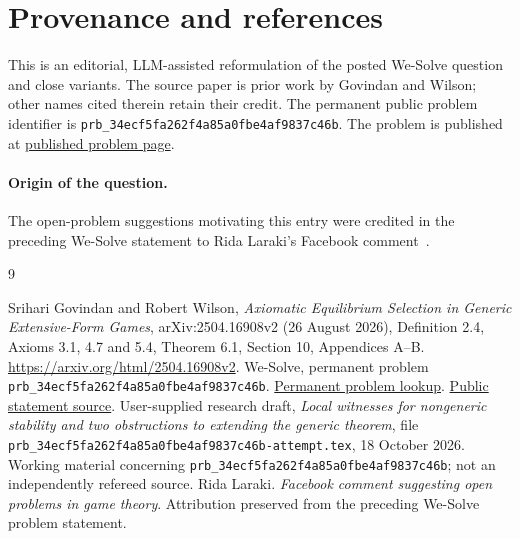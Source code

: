 \documentclass[11pt]{article}
\begin{document}
\section*{Provenance and references}
This is an editorial, LLM-assisted reformulation of the posted We-Solve
question and close variants. The source paper is prior work by
Govindan and Wilson; other names cited therein retain their credit.
The permanent public problem identifier is \texttt{prb\_34ecf5fa262f4a85a0fbe4af9837c46b}.
The problem is published at
\href{https://we-solve.github.io/problems/axiomatic-containment-of-mertens-stable-sets-without-genericity/}{published problem page}.

\paragraph{Origin of the question.}
The open-problem suggestions motivating this entry were credited in the
preceding We-Solve statement to Rida Laraki's Facebook
comment~\cite{laraki-facebook}.

\begin{thebibliography}{9}
\raggedright
{} Srihari Govindan and Robert Wilson,
\emph{Axiomatic Equilibrium Selection in Generic Extensive-Form Games},
arXiv:2504.16908v2 (26 August 2026), Definition 2.4, Axioms 3.1,
4.7 and 5.4, Theorem 6.1, Section 10, Appendices A--B.
\url{https://arxiv.org/html/2504.16908v2}.
 We-Solve, permanent problem \texttt{prb\_34ecf5fa262f4a85a0fbe4af9837c46b}.
\href{https://we-solve.github.io/api/v1/problems/prb_34ecf5fa262f4a85a0fbe4af9837c46b.json}{Permanent problem lookup}.
\href{https://github.com/We-Solve/research/blob/main/problems/34/prb_34ecf5fa262f4a85a0fbe4af9837c46b/statement.tex}{Public statement source}.
 User-supplied research draft,
\emph{Local witnesses for nongeneric stability and two obstructions to
extending the generic theorem}, file \texttt{prb\_34ecf5fa262f4a85a0fbe4af9837c46b-attempt.tex},
18 October 2026. Working material concerning \texttt{prb\_34ecf5fa262f4a85a0fbe4af9837c46b};
not an independently refereed source.
Rida Laraki.
\emph{Facebook comment suggesting open problems in game theory}.
Attribution preserved from the preceding We-Solve problem statement.
\end{thebibliography}
\end{document}
